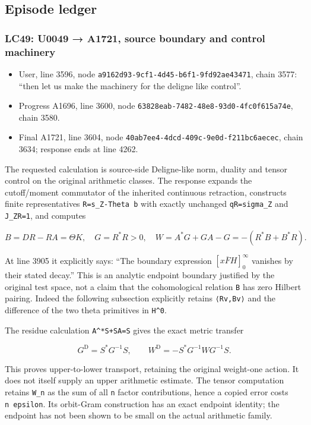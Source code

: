 \subsection{Episode ledger}\label{episode-ledger}

\subsubsection{LC49: U0049 → A1721, source boundary and control
machinery}\label{lc49-u0049-a1721-source-boundary-and-control-machinery}

\begin{itemize}
\tightlist
\item
  User, line 3596, node \texttt{a9162d93-9cf1-4d45-b6f1-9fd92ae43471},
  chain 3577: ``then let us make the machinery for the deligne like
  control''.
\item
  Progress A1696, line 3600, node
  \texttt{63828eab-7482-48e8-93d0-4fc0f615a74e}, chain 3580.
\item
  Final A1721, line 3604, node
  \texttt{40ab7ee4-4dcd-409c-9e0d-f211bc6aecec}, chain 3634; response
  ends at line 4262.
\end{itemize}

The requested calculation is source-side Deligne-like norm, duality and
tensor control on the original arithmetic classes. The response expands
the cutoff/moment commutator of the inherited continuous retraction,
constructs finite representatives \texttt{R=s\_Z-Theta\ b} with exactly
unchanged \texttt{qR=sigma\_Z} and \texttt{J\_ZR=1}, and computes

\[
B=DR-RA=\Theta K,\quad G=R^*R>0,\quad
W=A^*G+GA-G=-(R^*B+B^*R).
\]

At line 3905 it explicitly says: ``The boundary expression
\([x\overline F H]_0^\infty\) vanishes by their stated decay.'' This is
an analytic endpoint boundary justified by the original test space, not
a claim that the cohomological relation \texttt{B} has zero Hilbert
pairing. Indeed the following subsection explicitly retains
\texttt{⟨Rv,Bv⟩} and the difference of the two theta primitives in
\texttt{H\^{}0}.

The residue calculation \texttt{A\^{}*S+SA=S} gives the exact metric
transfer

\[
G^{\mathrm D}=S^*G^{-1}S,\qquad
W^{\mathrm D}=-S^*G^{-1}WG^{-1}S.
\]

This proves upper-to-lower transport, retaining the original weight-one
action. It does not itself supply an upper arithmetic estimate. The
tensor computation retains \texttt{W\_n} as the sum of all \texttt{n}
factor contributions, hence a copied error costs \texttt{n\ epsilon}.
Its orbit-Gram construction has an exact endpoint identity; the endpoint
has not been shown to be small on the actual arithmetic family.

